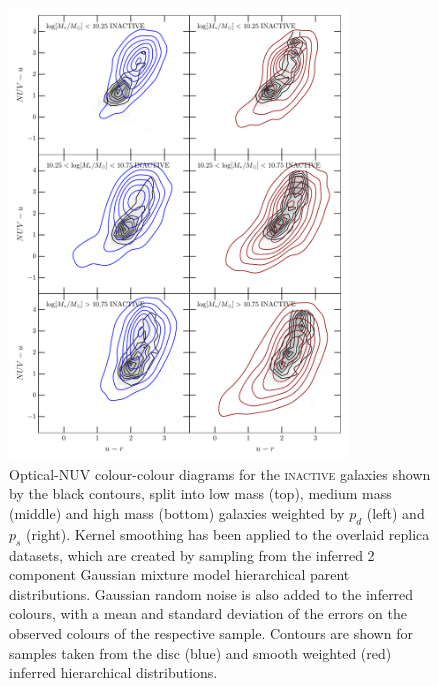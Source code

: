 \begin{figure}
\begin{centering}
\includegraphics[width=0.8\textwidth]{starpy/figc2b.pdf}
\caption[Replica colour-colour distributions using a hierarchical method]{Optical-NUV colour-colour diagrams for the \textsc{inactive} galaxies shown by the black contours, split into low mass (top), medium mass (middle) and high mass (bottom) galaxies weighted by $p_d$ (left) and $p_s$ (right). Kernel smoothing has been applied to the overlaid replica datasets, which are created by sampling from the inferred 2 component Gaussian mixture model hierarchical parent distributions. Gaussian random noise is also added to the inferred colours, with a mean and standard deviation of the errors on the observed colours of the respective sample. Contours are shown for samples taken from the disc (blue) and smooth weighted (red) inferred hierarchical distributions.}
\label{replica}
\end{centering}
\end{figure}

